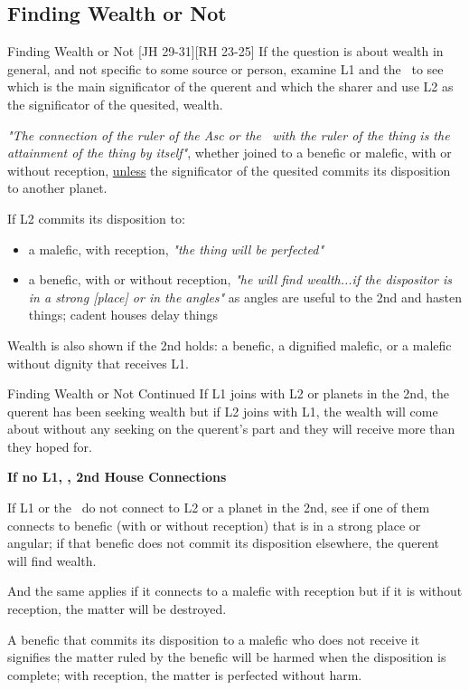 \subsection{Finding Wealth or Not}
\begin{frame}[t]{Finding Wealth or Not [JH 29-31][RH 23-25]}
If the question is about wealth in general, and not specific to some source or person, examine L1 and the \Moon\ to see which is the main significator of the querent and which the sharer and use L2 as the significator of the quesited, wealth.

\begin{block}{}
\textsl{"The connection of the ruler of the Asc or the \Moon\ with the ruler of the thing is the attainment of the thing by itself"}, whether joined to a benefic or malefic, with or without reception, \underline{unless} the significator of the quesited commits its disposition to another planet.\footnotemark[1]
\end{block}

If L2 commits its disposition to:
\begin{itemize}
\item a malefic, with reception, \textsl{"the thing will be perfected"}
\item a benefic, with or without reception, \textsl{"he will find wealth...if the dispositor is in a strong [place] or in the angles"} as angles are useful to the 2nd and hasten things; cadent houses delay things
\end{itemize}

Wealth is also shown if the 2nd holds: a benefic, a dignified malefic, or a malefic without dignity that receives L1.

\end{frame}
\begin{frame}[t]{Finding Wealth or Not Continued}
If L1 joins with L2 or planets in the 2nd, the querent has been seeking wealth but if L2 joins with L1, the wealth will come about without any seeking on the querent's part and they will receive more than they hoped for.

\textbf{If no L1, \Moon, 2nd House Connections}

If L1 or the \Moon\ do not connect to L2 or a planet in the 2nd, see if one of them connects to benefic (with or without reception) that is in a strong place or angular; if that benefic does not commit its disposition elsewhere, the querent will find wealth. 

And the same applies if it connects to a malefic with reception but if it is without reception, the matter will be destroyed.

\begin{block}{}
A benefic that commits its disposition to a malefic who does not receive it signifies the matter ruled by the benefic will be harmed when the disposition is complete; with reception, the matter is perfected without harm.
\end{block}






\end{frame}